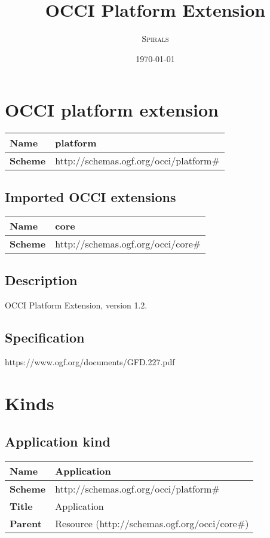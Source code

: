 \documentclass{article}
\title{OCCI Platform Extension} %
\author{\textsc{Spirals}} %
\date{\today} %
\begin{document}
 

\maketitle %
\newpage
\section{OCCI platform extension}
\begin{center}
\begin{tabular}{|l|l|}
  \hline
  \textbf{Name} & platform \\
  \hline  
  \textbf{Scheme} & http://schemas.ogf.org/occi/platform\# \\
  \hline
\end{tabular}
\end{center}
\subsection{Imported OCCI extensions}

\begin{center} 
\begin{tabular}{|l|l|}
  \hline
  \textbf{Name} & core \\
  \hline  
  \textbf{Scheme} & http://schemas.ogf.org/occi/core\# \\
  \hline
\end{tabular}
\end{center}

\subsection{Description}
OCCI Platform Extension, version 1.2.
\subsection{Specification}
https://www.ogf.org/documents/GFD.227.pdf
\section{Kinds}
\subsection{Application kind}
\begin{center}
\begin{tabular}{|l|l|}
  \hline
  \textbf{Name} & Application \\
  \hline  
  \textbf{Scheme} & http://schemas.ogf.org/occi/platform\# \\
  \hline
  \textbf{Title} & Application \\
  \hline
  \textbf{Parent} & Resource (http://schemas.ogf.org/occi/core\#) \\
  \hline
\end{tabular}
\end{center}
\end{document}
